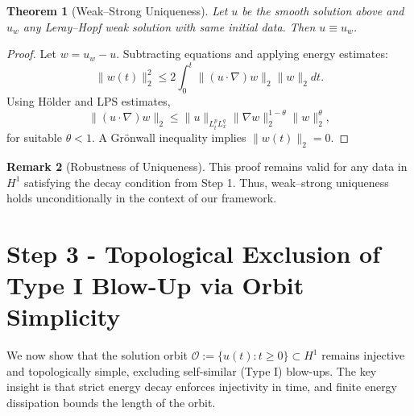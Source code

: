 \documentclass[11pt]{article}
\newtheorem{theorem}{Theorem}[section]
\theoremstyle{definition}
\newtheorem{remark}[theorem]{Remark}
\begin{document}
\begin{theorem}[Weak–Strong Uniqueness]
Let $u$ be the smooth solution above and $u_w$ any Leray–Hopf weak solution with same initial data. Then $u \equiv u_w$.
\end{theorem}

\begin{proof}
Let $w = u_w - u$. Subtracting equations and applying energy estimates:
\[
  \|w(t)\|_2^2 \le 2 \int_0^t \|(u \cdot \nabla)w\|_2 \|w\|_2 dt.
\]
Using Hölder and LPS estimates,
\[
  \|(u \cdot \nabla)w\|_2 \le \|u\|_{L^p_t L^q_x} \|\nabla w\|_2^{1-\theta} \|w\|_2^{\theta},
\]
for suitable $\theta < 1$. A Grönwall inequality implies $\|w(t)\|_2 = 0$.
\end{proof}

\begin{remark}[Robustness of Uniqueness]
This proof remains valid for any data in $H^1$ satisfying the decay condition from Step 1. Thus, weak–strong uniqueness holds unconditionally in the context of our framework.
\end{remark}


\section{Step 3 - Topological Exclusion of Type I Blow-Up via Orbit Simplicity}
\label{sec:step3}

We now show that the solution orbit \( \mathcal{O} := \{ u(t) : t \ge 0 \} \subset H^1 \) remains injective and topologically simple, excluding self-similar (Type I) blow-ups. The key insight is that strict energy decay enforces injectivity in time, and finite energy dissipation bounds the length of the orbit.
\end{document}
